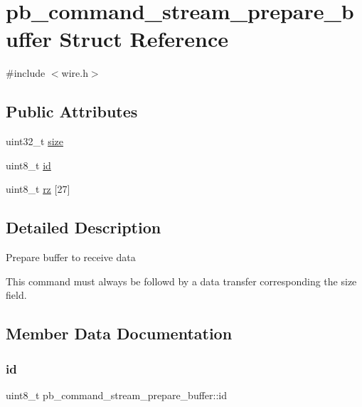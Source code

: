 \hypertarget{structpb__command__stream__prepare__buffer}{}\section{pb\+\_\+command\+\_\+stream\+\_\+prepare\+\_\+buffer Struct Reference}
\label{structpb__command__stream__prepare__buffer}


{\ttfamily \#include $<$wire.\+h$>$}

\subsection*{Public Attributes}
\begin{DoxyCompactItemize}
\item 
uint32\+\_\+t \hyperlink{structpb__command__stream__prepare__buffer_a64c7d97b8194cf69b5aea6a2634e5427}{size}
\item 
uint8\+\_\+t \hyperlink{structpb__command__stream__prepare__buffer_a180f6db3eab9cdc5e928f2a7a80e4101}{id}
\item 
uint8\+\_\+t \hyperlink{structpb__command__stream__prepare__buffer_a368af527cd426e6841c1b62353eb22b9}{rz} \mbox{[}27\mbox{]}
\end{DoxyCompactItemize}


\subsection{Detailed Description}
Prepare buffer to receive data

This command must always be followd by a data transfer corresponding the size field. 

\subsection{Member Data Documentation}
\mbox{\label{structpb__command__stream__prepare__buffer_a180f6db3eab9cdc5e928f2a7a80e4101}} 
\subsubsection{\texorpdfstring{id}{id}}
{\footnotesize\ttfamily uint8\+\_\+t pb\+\_\+command\+\_\+stream\+\_\+prepare\+\_\+buffer\+::id}

